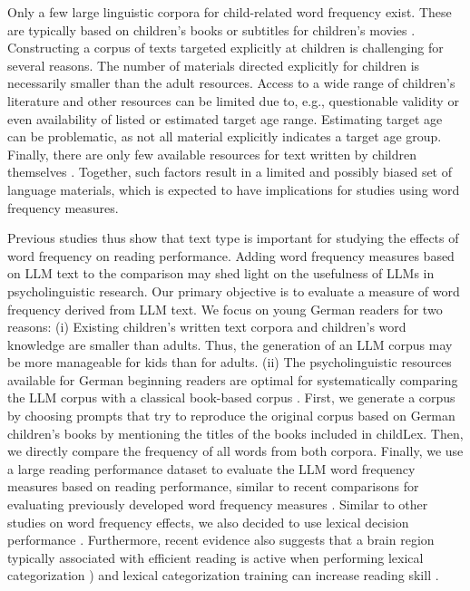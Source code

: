 \documentclass[doc, a4paper]{apa7}
\begin{document}
Only a few large linguistic corpora for child-related word frequency exist. These are typically based on children's books or subtitles for children's movies \citep{schroeder_childlex_2015, tellings_basilex_2014, van_heuven_subtlex-uk_2014, Korochkina_2024}. Constructing a corpus of texts targeted explicitly at children is challenging for several reasons. The number of materials directed explicitly for children is necessarily smaller than the adult resources. Access to a wide range of children's literature and other resources can be limited due to, e.g., questionable validity or even availability of listed or estimated target age range. Estimating target age can be problematic, as not all material explicitly indicates a target age group. Finally, there are only few available resources for text written by children themselves \citep[see, e.g.,][]{laarmann-quante_litkey_2019}. Together, such factors result in a limited and possibly biased set of language materials, which is expected to have implications for studies using word frequency measures. 

Previous studies thus show that text type is important for studying the effects of word frequency on reading performance. Adding word frequency measures based on LLM text to the comparison may shed light on the usefulness of LLMs in psycholinguistic research. Our primary objective is to evaluate a measure of word frequency derived from LLM text. We focus on young German readers for two reasons: (i) Existing children's written text corpora and children's word knowledge are smaller than adults. Thus, the generation of an LLM corpus may be more manageable for kids than for adults. (ii) The psycholinguistic resources available for German beginning readers are optimal for systematically comparing the LLM corpus with a classical book-based corpus \citep[childLex;][]{schroeder_childlex_2015}. First, we generate a corpus by choosing prompts that try to reproduce the original corpus based on German children's books by mentioning the titles of the books included in childLex. Then, we directly compare the frequency of all words from both corpora. Finally, we use a large reading performance dataset \citep[DeveL;][]{schroter_developmental_2017} to evaluate the LLM word frequency measures based on reading performance, similar to recent comparisons for evaluating previously developed word frequency measures \citep[e.g.,][]{brysbaert_word_2011, brysbaert_word_2018}. Similar to other studies on word frequency effects, we also decided to use lexical decision performance \citep[i.e., an often-used classical task, that offers a window into understanding word recognition in children;][]{davies_reading_2017, monster_word_2022, van_den_boer_lexical_2012}. Furthermore, recent evidence also suggests that a brain region typically associated with efficient reading \citep{dehaene_unique_2011} is active when performing lexical categorization \citep[i.e., the process underlying lexical decisions;][]{gagl_lexical_2022}) and lexical categorization training can increase reading skill \citep{gagl_investigating_2023}.
\end{document}
